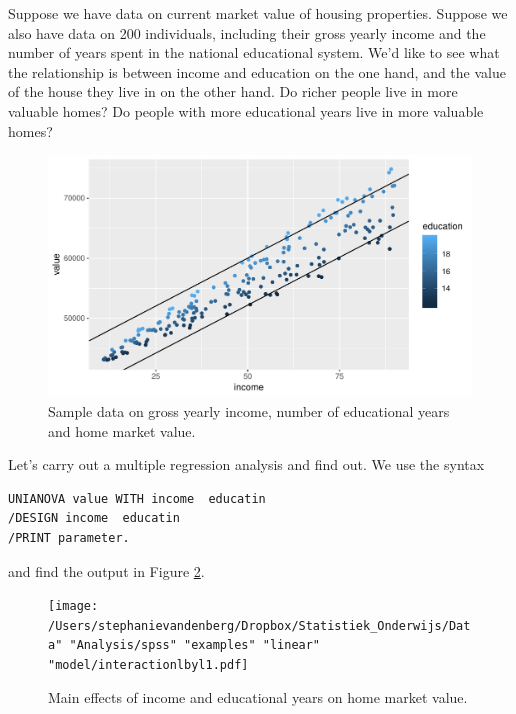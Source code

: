 \documentclass[]{report}\usepackage[]{graphicx}\usepackage[]{color}
\makeatletter
\def\maxwidth{ %
  \ifdim\Gin@nat@width>\linewidth
    \linewidth
  \else
    \Gin@nat@width
  \fi
}
\makeatother
\begin{document}
Suppose we have data on current market value of housing properties. Suppose we also have data on 200 individuals, including their gross yearly income and the number of years spent in the national educational system. We'd like to see what the relationship is between income and education on the one hand, and the value of the house they live in on the other hand. Do richer people live in more valuable homes? Do people with more educational years live in more valuable homes? 

\begin{figure}

{\centering \includegraphics[width=\maxwidth]{figure/linearbylinear_1-1} 

}

\caption[Sample data on gross yearly income, number of educational years and home market value]{Sample data on gross yearly income, number of educational years and home market value.}\label{fig:linearbylinear_1}
\end{figure}




Let's carry out a multiple regression analysis and find out. We use the syntax

\begin{verbatim}
UNIANOVA value WITH income  educatin
/DESIGN income  educatin 
/PRINT parameter.
\end{verbatim}

and find the output in Figure \ref{fig:interactionlbyl1}. 

\begin{figure}[h]
    \begin{center}
       \texttt{[image: /Users/stephanievandenberg/Dropbox/Statistiek\_Onderwijs/Data" "Analysis/spss" "examples"  "linear" "model/interactionlbyl1.pdf]}
    \end{center}
    \label{fig:interactionlbyl1}
    \caption{Main effects of income and educational years on home market value.}
\end{figure}
\end{document}
